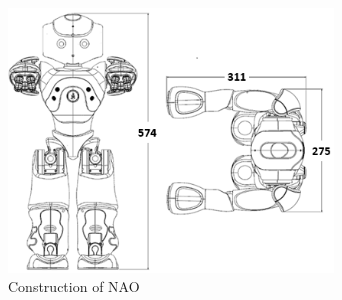 \begin{figure}
	[h] \centering 
	\includegraphics[height=7cm]{figures/content/nao-construction.png} 
	\caption{Construction of NAO}
	\label{fg:nao:construction} 
\end{figure}